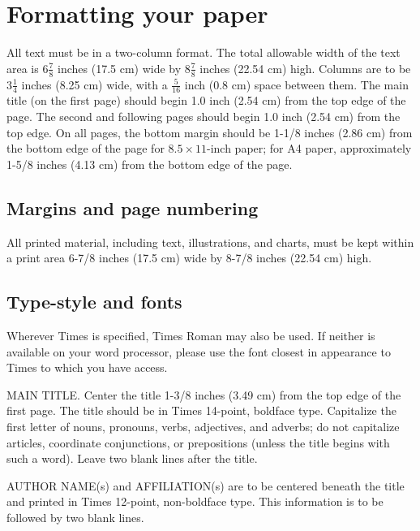 \section{Formatting your paper}

All text must be in a two-column format.
The total allowable width of the text area is $6\frac78$ inches (17.5 cm) wide by $8\frac78$ inches (22.54 cm) high.
Columns are to be $3\frac14$ inches (8.25 cm) wide, with a $\frac{5}{16}$ inch (0.8 cm) space between them.
The main title (on the first page) should begin 1.0 inch (2.54 cm) from the top edge of the
page.
The second and following pages should begin 1.0 inch (2.54 cm) from the top edge.
On all pages, the bottom margin should be 1-1/8 inches (2.86 cm) from the bottom edge of the page for $8.5 \times 11$-inch paper; for A4 paper, approximately 1-5/8 inches (4.13 cm) from the bottom edge of the page.

\subsection{Margins and page numbering}

All printed material, including text, illustrations, and charts, must be kept within a print area 6-7/8 inches (17.5 cm) wide by 8-7/8 inches (22.54 cm) high.

\subsection{Type-style and fonts}

Wherever Times is specified, Times Roman may also be used.
If neither is available on your word processor, please use the font closest in appearance to Times to which you have access.

MAIN TITLE.
Center the title 1-3/8 inches (3.49 cm) from the top edge of the first page.
The title should be in Times 14-point, boldface type.
Capitalize the first letter of nouns, pronouns, verbs, adjectives, and adverbs; do not capitalize articles, coordinate conjunctions, or prepositions (unless the title begins with such a word). 
Leave two blank lines after the title.

AUTHOR NAME(s) and AFFILIATION(s) are to be centered beneath the title and printed in Times 12-point, non-boldface type.
This information is to be followed by two blank lines.

